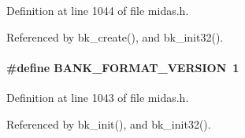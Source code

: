 \begin{DoxyItemize}
\item 
\end{DoxyItemize}

Definition at line 1044 of file midas.h.

Referenced by bk\_\-create(), and bk\_\-init32().
\paragraph[{BANK\_\-FORMAT\_\-VERSION}]{\setlength{\rightskip}{0pt plus 5cm}\#define BANK\_\-FORMAT\_\-VERSION~1}\hfill\label{group__mbank_gaee768d2c28265eb2b34227d7eae57a18}

\begin{DoxyItemize}
\item 
\end{DoxyItemize}

Definition at line 1043 of file midas.h.

Referenced by bk\_\-init(), and bk\_\-init32().